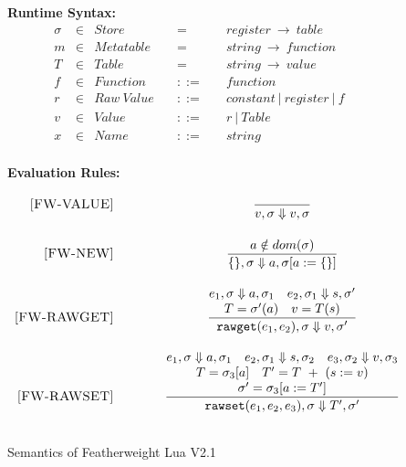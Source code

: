 \documentclass{article}
\begin{document}
\begin{figure}[P]
\caption{Semantics of Featherweight Lua V2.1}
{\bf Runtime Syntax:}
\label{fig:FW2.1Sem}
\[
\begin{array}{rclcl}
  \sigma & \in & {Store} \quad  & = & \quad {register} ~\rightarrow ~{table} \\
  m & \in & {Metatable} \quad  & = & \quad {string} ~\rightarrow ~{function} \\
  T & \in & {Table} \quad  & = & \quad {string} ~\rightarrow ~{value} \\
  f & \in & {Function} \quad & ::= & \quad function \\
  r & \in & {Raw~Value} \quad & ::= & \quad constant~|~ register ~|~ f~ \\
  v & \in & {Value} \quad & ::= & \quad r~|~ Table~ \\
  x & \in & {Name} \quad & ::= & \quad string 
  \\
\end{array}
\]

{\bf Evaluation Rules:~~~ } \\
\[
\begin{array}{r@{\qquad\qquad}c}
\ssrule{FW-VALUE}{
}{
  \semanticFull {v}{\sigma} {v}{\sigma}
}
\ssrule{FW-NEW}{
  a \notin dom(\sigma)
}{
  \semanticFull {\{\}} {\sigma}   {a} {\sigma[a := \{\}]}
}
\ssrule{FW-RAWGET}{
  \semanticFull{e_1}  {\sigma}    {a}  {\sigma_1} \quad
  \semanticFull{e_2}  {\sigma_1}    {s}  {\sigma'} \\
  T = \sigma'(a)\quad
  v = T(s)\\
  
}{
  \semanticFull {{\tt rawget}(e_1,e_2)} {\sigma}   {v} {\sigma'}
}
\ssrule{FW-RAWSET}{
  \semanticFull{e_1}{\sigma}{a}{\sigma_1} \quad
  \semanticFull{e_2}{\sigma_1}{s}{\sigma_2} \quad
  \semanticFull{e_3}{\sigma_2}{v}{\sigma_3} \\
  T = \sigma_3[a] \quad
  T' = T~+~(s := v) \\
  \sigma' = \sigma_3[a:=T']
}{
  \semanticFull{{\tt rawset}(e_1,e_2,e_3)}{\sigma}{T'}{\sigma'}
}
 

\end{array}\]
\end{figure}
\end{document}
